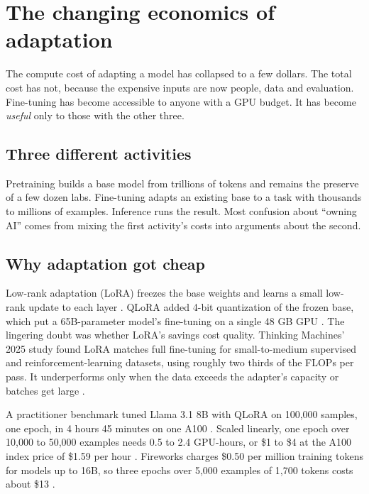 \section{The changing economics of adaptation}

The compute cost of adapting a model has collapsed to a few dollars. The total cost has not, because the expensive inputs are now people, data and evaluation. Fine-tuning has become accessible to anyone with a GPU budget. It has become \emph{useful} only to those with the other three.

\subsection{Three different activities}

Pretraining builds a base model from trillions of tokens and remains the preserve of a few dozen labs. Fine-tuning adapts an existing base to a task with thousands to millions of examples. Inference runs the result. Most confusion about ``owning AI'' comes from mixing the first activity's costs into arguments about the second.

\subsection{Why adaptation got cheap}

Low-rank adaptation (LoRA) freezes the base weights and learns a small low-rank update to each layer \citep{hu2021lora}. QLoRA added 4-bit quantization of the frozen base, which put a 65B-parameter model's fine-tuning on a single 48 GB GPU \citep{dettmers2023qlora}. The lingering doubt was whether LoRA's savings cost quality. Thinking Machines' 2025 study found LoRA matches full fine-tuning for small-to-medium supervised and reinforcement-learning datasets, using roughly two thirds of the FLOPs per pass. It underperforms only when the data exceeds the adapter's capacity or batches get large \citep{schulman2025lora}.

 A practitioner benchmark tuned Llama 3.1 8B with QLoRA on 100,000 samples, one epoch, in 4 hours 45 minutes on one A100 \citep{labonne2024}. Scaled linearly, one epoch over 10,000 to 50,000 examples needs 0.5 to 2.4 GPU-hours, or \$1 to \$4 at the A100 index price of \$1.59 per hour \citep{silicondata2026a100}. Fireworks charges \$0.50 per million training tokens for models up to 16B, so three epochs over 5,000 examples of 1,700 tokens costs about \$13 \citep{fireworks2026pricing}.

